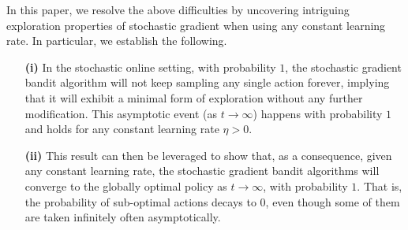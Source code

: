 In this paper, we resolve the above difficulties by uncovering intriguing exploration properties of stochastic gradient when using any constant learning rate.  In particular, we establish the following.
\begin{itemize}[leftmargin=16pt, nosep]
    \item[\textbf{(i)}] In the stochastic online setting, with probability $1$, the stochastic gradient bandit algorithm will not keep sampling any single action forever, implying that it will exhibit a minimal form of exploration without any further modification. This asymptotic event (as $t \to \infty$) happens with probability $1$ and holds for any constant learning rate $\eta>0$.
    \item[\textbf{(ii)}] This result can then be leveraged to show that, as a consequence, given any constant learning rate, the stochastic gradient bandit algorithms will converge to the globally optimal policy as $t \to \infty$, with probability $1$. That is, the probability of sub-optimal actions decays to $0$, even though some of them are taken infinitely often asymptotically.
\end{itemize}




